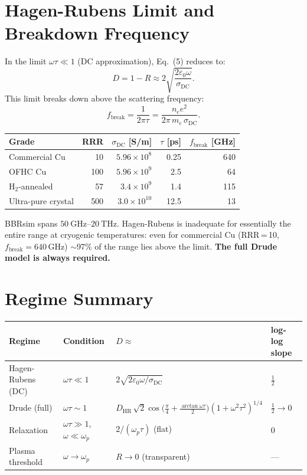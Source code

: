 \documentclass[11pt]{article}
\begin{document}
\section{Hagen-Rubens Limit and Breakdown Frequency}

In the limit $\omega\tau \ll 1$ (DC approximation), Eq.~(5) reduces to:
\[
  D = 1 - R \approx 2\sqrt{\frac{2\varepsilon_0\omega}{\sigma_\mathrm{DC}}}.
\]
This limit breaks down above the scattering frequency:
\[
  f_\mathrm{break} = \frac{1}{2\pi\tau}
  = \frac{n_e e^2}{2\pi\,m_e\,\sigma_\mathrm{DC}}.
\]

\begin{center}
\begin{tabular}{@{}lrrrr@{}}
\toprule
Grade & RRR & $\sigma_\mathrm{DC}$ [S/m] & $\tau$ [ps] & $f_\mathrm{break}$ [GHz] \\
\midrule
Commercial Cu    & 10  & $5.96\times10^{8}$ & 0.25 & 640 \\
OFHC Cu          & 100 & $5.96\times10^{9}$ & 2.5  & 64  \\
H$_2$-annealed   & 57  & $3.4\times10^{9}$  & 1.4  & 115 \\
Ultra-pure crystal & 500 & $3.0\times10^{10}$ & 12.5 & 13 \\
\bottomrule
\end{tabular}
\end{center}

BBRsim spans $50\ \mathrm{GHz}$--$20\ \mathrm{THz}$.
Hagen-Rubens is inadequate for essentially the entire range at cryogenic
temperatures: even for commercial Cu (RRR\,=\,10, $f_\mathrm{break}=640$\,GHz)
$\sim$97\% of the range lies above the limit.
\textbf{The full Drude model is always required.}

\section{Regime Summary}

\begin{center}
\begin{tabular}{@{}llll@{}}
\toprule
Regime & Condition & $D \approx$ & log-log slope \\
\midrule
Hagen-Rubens (DC)   & $\omega\tau \ll 1$ &
  $2\sqrt{2\varepsilon_0\omega/\sigma_\mathrm{DC}}$ & $\tfrac{1}{2}$ \\[4pt]
Drude (full) & $\omega\tau \sim 1$ &
  $D_\mathrm{HR}\,\sqrt{2}\cos\!\bigl(\tfrac{\pi}{4}+\tfrac{\arctan\omega\tau}{2}\bigr)(1+\omega^2\tau^2)^{1/4}$ & $\tfrac{1}{2}\to 0$ \\[4pt]
Relaxation & $\omega\tau \gg 1$, $\omega\ll\omega_p$ &
  $2/(\omega_p\tau)$ \;(flat) & $0$ \\[4pt]
Plasma threshold & $\omega\to\omega_p$ &
  $R\to 0$ (transparent) & --- \\
\bottomrule
\end{tabular}
\end{center}
\end{document}
